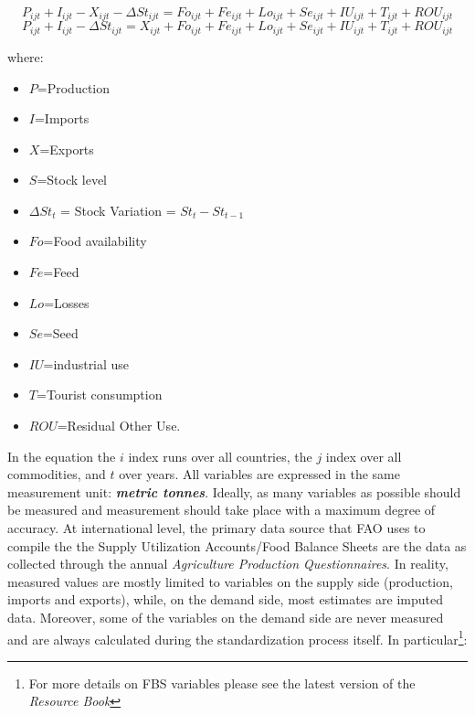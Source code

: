 \documentclass[]{article}
\providecommand{\tightlist}{%
  \setlength{\itemsep}{0pt}\setlength{\parskip}{0pt}}
\let\rmarkdownfootnote\footnote%
\def\footnote{\protect\rmarkdownfootnote}
\begin{document}
\begin{equation}
\label{eq:balance1}
P_{ijt} + I_{ijt} - X_{ijt} - \Delta St_{ijt} = Fo_{ijt} + Fe_{ijt} + Lo_{ijt} + Se_{ijt} + IU_{ijt} + T_{ijt}  + ROU_{ijt}
\end{equation}\begin{equation}
\label{eq:balance2}
P_{ijt} + I_{ijt} - \Delta St_{ijt} = X_{ijt} + Fo_{ijt} + Fe_{ijt} + Lo_{ijt} + Se_{ijt} + IU_{ijt} + T_{ijt} + ROU_{ijt}
\end{equation}

where:

\begin{itemize}
\tightlist
\item
  \(P\)=Production
\item
  \(I\)=Imports
\item
  \(X\)=Exports
\item
  \(S\)=Stock level
\item
  \(\Delta St_{t}\) = Stock Variation = \(St_{t} - St_{t-1}\)
\item
  \(Fo\)=Food availability
\item
  \(Fe\)=Feed
\item
  \(Lo\)=Losses
\item
  \(Se\)=Seed
\item
  \(IU\)=industrial use
\item
  \(T\)=Tourist consumption
\item
  \(ROU\)=Residual Other Use.
\end{itemize}

In the equation the \(i\) index runs over all countries, the \(j\) index
over all commodities, and \(t\) over years. All variables are expressed
in the same measurement unit: \textbf{\emph{metric tonnes}}. Ideally, as
many variables as possible should be measured and measurement should
take place with a maximum degree of accuracy. At international level,
the primary data source that FAO uses to compile the the Supply
Utilization Accounts/Food Balance Sheets are the data as collected
through the annual \emph{Agriculture Production Questionnaires}. In
reality, measured values are mostly limited to variables on the supply
side (production, imports and exports), while, on the demand side, most
estimates are imputed data. Moreover, some of the variables on the
demand side are never measured and are always calculated during the
standardization process itself. In particular\footnote{For more details
  on FBS variables please see the latest version of the \emph{Resource
  Book}}:
\end{document}
